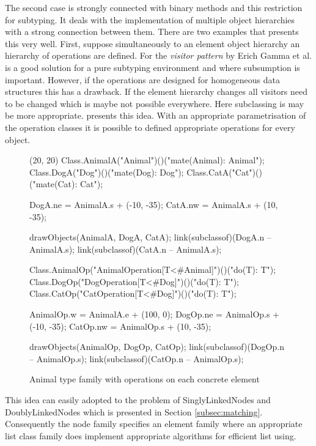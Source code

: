The second case is strongly connected with binary methods and this
restriction for subtyping. It deals with the implementation of multiple
object hierarchies with a strong connection between them. There are two
examples that presents this very well. First, suppose simultaneously to
an element object hierarchy an hierarchy of operations are defined. For
the \emph{visitor pattern} by Erich Gamma et al. \cite{gamma_design_1995}
is a good solution for a pure subtyping environment and where subsumption
is important. However, if the operations are designed for homogeneous
data structures this has a drawback. If the element hierarchy changes all
visitors need to be changed which is maybe not possible everywhere. Here
subclassing is may be more appropriate. 
presents this idea. With an appropriate parametrisation of the operation
classes it is possible to defined appropriate operations for every object.

\begin{figure}[H]
	\centering
	\begin{emp}[classdiag](20, 20)
		Class.AnimalA("Animal")()("mate(Animal): Animal");
		Class.DogA("Dog")()("mate(Dog): Dog");
		Class.CatA("Cat")()("mate(Cat): Cat");

		DogA.ne = AnimalA.s + (-10, -35);
		CatA.nw = AnimalA.s + (10, -35);

		drawObjects(AnimalA, DogA, CatA);
		link(subclassof)(DogA.n -- AnimalA.s);
		link(subclassof)(CatA.n -- AnimalA.s);

		Class.AnimalOp("AnimalOperation[T<#Animal]")()("do(T): T");
		Class.DogOp("DogOperation[T<#Dog]")()("do(T): T");
		Class.CatOp("CatOperation[T<#Dog]")()("do(T): T");

		AnimalOp.w = AnimalA.e + (100, 0);
		DogOp.ne = AnimalOp.s + (-10, -35);
		CatOp.nw = AnimalOp.s + (10, -35);

		drawObjects(AnimalOp, DogOp, CatOp);
		link(subclassof)(DogOp.n -- AnimalOp.s);
		link(subclassof)(CatOp.n -- AnimalOp.s);
	\end{emp}
	\caption{Animal type family with operations on each concrete element}
	\label{fig:operationFamily}
\end{figure}

This idea can easily adopted to the problem of SinglyLinkedNodes
and DoublyLinkedNodes which is presented in Section
\ref{subsec:matching}. Consequently the node family specifies an element
family where an appropriate list class family does implement appropriate
algorithms for efficient list using.

